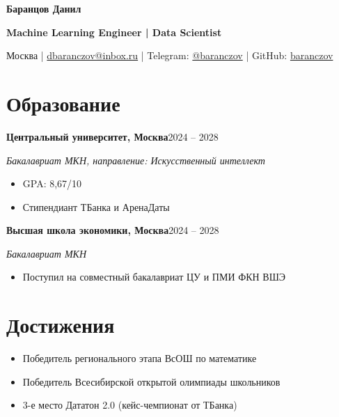 \documentclass[a4paper,11pt]{article}
\newcommand{\entry}[3]{\textbf{#1}\hfill #3\par\textit{#2}\par}
\begin{document}
\fontsize{10.5}{13}\selectfont
\begin{center}
{\fontsize{14.3}{17}\selectfont\bfseries Баранцов Данил}\par
{\bfseries Machine Learning Engineer | Data Scientist}\par
Москва | \href{mailto:dbaranczov@inbox.ru}{dbaranczov@inbox.ru} |
Telegram: \href{https://t.me/baranczov}{@baranczov} |
GitHub: \href{https://github.com/baranczov}{baranczov}
\end{center}
\vspace{-2pt}
\section*{Образование}
\entry{Центральный университет, Москва}{Бакалавриат МКН, направление: Искусственный интеллект}{2024 -- 2028}
\begin{itemize}
\item GPA: 8,67/10
\item Стипендиант ТБанка и АренаДаты
\end{itemize}
\vspace{3pt}
\entry{Высшая школа экономики, Москва}{Бакалавриат МКН}{2024 -- 2028}
\begin{itemize}
\item Поступил на совместный бакалавриат ЦУ и ПМИ ФКН ВШЭ
\end{itemize}
\section*{Достижения}
\begin{itemize}
\item Победитель регионального этапа ВсОШ по математике
\item Победитель Всесибирской открытой олимпиады школьников
\item 3-е место Дататон 2.0 (кейс-чемпионат от ТБанка)
\end{itemize}
\end{document}
